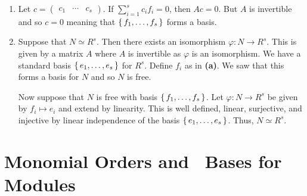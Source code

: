 \documentclass[letterpaper, 11pt, oneside]{book}
\begin{document}
\begin{sol}\label{ex:UAG_5.1.19}
  \begin{enumerate}
    \item Let $c = \begin{pmatrix} c_{1} & \cdots & c_{s} \end{pmatrix}$.
          If $\sum_{i = 1}^{s} c_{i}f_{i} = 0$, then $Ac = 0$.
          But $A$ is invertible and so $c = 0$ meaning that $\set{f_{1}, \ldots, f_{s}}$ forms a basis.
    \item Suppose that $N \simeq R^{s}$.
          Then there exists an isomorphism $\varphi\colon N \to R^{s}$.
          This is given by a matrix $A$ where $A$ is invertible as $\varphi$ is an isomorphism.
          We have a standard basis $\set{e_{1}, \ldots, e_{s}}$ for $R^{s}$.
          Define $f_{i}$ as in \textbf{(a)}.
          We saw that this forms a basis for $N$ and so $N$ is free.

          Now suppose that $N$ is free with basis $\set{f_{1}, \ldots, f_{s}}$.
          Let $\varphi\colon N \to R^{s}$ be given by $f_{i} \mapsto e_{i}$ and extend by linearity.
          This is well defined, linear, surjective, and injective by linear independence of the basis $\set{e_{1}, \ldots, e_{s}}$.
          Thus, $N \simeq R^{s}$.
  \end{enumerate}
\end{sol}

\clearpage

\section{Monomial Orders and \Grobner\ Bases for Modules}
\end{document}
